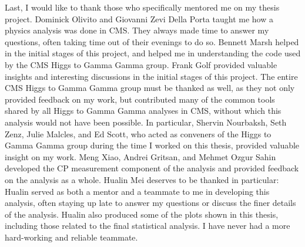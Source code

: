 \begin{frontmatter}
\begin{acknowledgements}
    Last, I would like to thank those who specifically mentored me on my thesis project.
    Dominick Olivito and Giovanni Zevi Della Porta taught me how a physics analysis was done in CMS. They always made time to answer my questions, often taking time out of their evenings to do so.
    Bennett Marsh helped in the initial stages of this project, and helped me in understanding the code used by the CMS Higgs to Gamma Gamma group.
    Frank Golf provided valuable insights and interesting discussions in the initial stages of this project.
    The entire CMS Higgs to Gamma Gamma group must be thanked as well, as they not only provided feedback on my work, but contributed many of the common tools shared by all Higgs to Gamma Gamma analyses in CMS, without which this analysis would not have been possible.
    In particular, Shervin Nourbaksh, Seth Zenz, Julie Malcles, and Ed Scott, who acted as conveners of the Higgs to Gamma Gamma group during the time I worked on this thesis, provided valuable insight on my work.
    Meng Xiao, Andrei Gritsan, and Mehmet Ozgur Sahin developed the CP measurement component of the analysis and provided feedback on the analysis as a whole.
    Hualin Mei deserves to be thanked in particular: Hualin served as both a mentor and a teammate to me in developing this analysis, often staying up late to answer my questions or discuss the finer details of the analysis. Hualin also produced some of the plots shown in this thesis, including those related to the final statistical analysis. I have never had a more hard-working and reliable teammate.

\end{acknowledgements}



\end{frontmatter}
